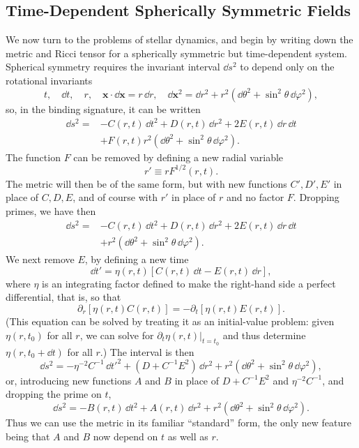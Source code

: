 
\subsection{Time-Dependent Spherically Symmetric Fields}\label{sec:11.7}

We now turn to the problems of stellar dynamics, and begin by writing down the
metric and Ricci tensor for a spherically symmetric but time-dependent system.
Spherical symmetry requires the invariant interval \(\dd s^2\) to depend only on
the rotational invariants
\[
  t,\quad \dd t,\quad r,\quad
  \mathbf{x}\cdot \dd\mathbf{x}=r\,\dd r,\quad
  \dd\mathbf{x}^2=\dd r^2+r^2(\dd\theta^2+\sin^2\theta\,\dd\varphi^2),
\]
so, in the binding signature, it can be written
\[
  \begin{aligned}
  \dd s^2={}&
  -C(r,t)\,\dd t^2+D(r,t)\,\dd r^2+2E(r,t)\,\dd r\,\dd t\\
  &+F(r,t)r^2(\dd\theta^2+\sin^2\theta\,\dd\varphi^2).
  \end{aligned}
\]
The function \(F\) can be removed by defining a new radial variable
\[
  r'\equiv rF^{1/2}(r,t).
\]
The metric will then be of the same form, but with new functions
\(C',D',E'\) in place of \(C,D,E\), and of course with \(r'\) in place of
\(r\) and no factor \(F\). Dropping primes, we have then
\[
  \begin{aligned}
  \dd s^2={}&
  -C(r,t)\,\dd t^2+D(r,t)\,\dd r^2+2E(r,t)\,\dd r\,\dd t\\
  &+r^2(\dd\theta^2+\sin^2\theta\,\dd\varphi^2).
  \end{aligned}
\]
We next remove \(E\), by defining a new time
\[
  \dd t'=\eta(r,t)[C(r,t)\,\dd t-E(r,t)\,\dd r],
\]
where \(\eta\) is an integrating factor defined to make the right-hand side a
perfect differential, that is, so that
\[
  \partial_r[\eta(r,t)C(r,t)]
  =
  -\partial_t[\eta(r,t)E(r,t)].
\]
(This equation can be solved by treating it as an initial-value problem:
given \(\eta(r,t_0)\) for all \(r\), we can solve for
\(\partial_t\eta(r,t)|_{t=t_0}\) and thus determine
\(\eta(r,t_0+\dd t)\) for all \(r\).) The interval is then
\[
  \dd s^2
  =
  -\eta^{-2}C^{-1}\,\dd t'^2
  +(D+C^{-1}E^2)\,\dd r^2
  +r^2(\dd\theta^2+\sin^2\theta\,\dd\varphi^2),
\]
or, introducing new functions \(A\) and \(B\) in place of
\(D+C^{-1}E^2\) and \(\eta^{-2}C^{-1}\), and dropping the prime on \(t\),
\begin{equation}
  \dd s^2
  =
  -B(r,t)\,\dd t^2+A(r,t)\,\dd r^2
  +r^2(\dd\theta^2+\sin^2\theta\,\dd\varphi^2).
  \tag{11.7.1}\label{eq:11.7.1}
\end{equation}
Thus we can use the metric in its familiar ``standard'' form, the only new
feature being that \(A\) and \(B\) now depend on \(t\) as well as \(r\).

